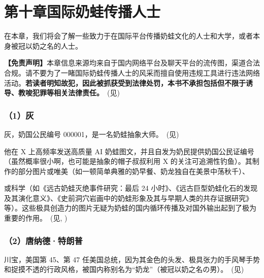 
\clearpage
\section{第十章\quad 国际奶蛙传播人士}

在本章，我们将会了解一些致力于在国际平台传播奶蛙文化的人士和大学，或者本身被冠以奶之名的人士。

\textbf{【免责声明】}本章信息来源均来自于国内网络平台及聊天平台的流传图，渠道合法合规。请不要为了一睹国际奶蛙传播人士的风采而擅自使用违规工具进行违法网络活动。\textbf{若读者明知故犯，因此被抓获受到法律处罚，本书不承担包括但不限于诱导、教唆犯罪等相关法律责任。}~(见)



\subsubsection{（1）灰}



灰，奶国公民编号 000001，是一名奶蛙抽象大师。~(见)

他在 X 上高频率发送高质量 AI 奶蛙图文，并且自发为奶民提供奶国公民证编号（虽然概率很小啊，也可能是抽象的帽子叔叔利用 X 的关注可追溯性钓鱼）。其制作的部分图片或唯美（如一顿简单典雅的奶早餐、奶龙独自在美景中荡秋千）、

\clearpage
\noindent 或科学（如《远古奶蛙灭绝事件研究：最后 24 小时》、《远古巨型奶蛙化石的发现及其演化意义》、《史前洞穴岩画中的奶蛙形象及其与早期人类的共存证据研究》等）。这些极具创造力的图片无疑为奶蛙的国内循环传播及对国外输出起到了极为重要的作用。~(见, )





\subsubsection{（2）唐纳德·特朗普}

川宝，美国第 45、第 47 任美国总统，因为其金色的头发、极具张力的手风琴手势和捉摸不透的行政风格，被国内称别名为“奶龙”（被冠以奶之名の男）。~(见)

\clearpage


